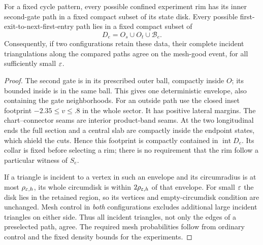 \begin{lemma}
\label{lemma:fixed-collar}
For a fixed cycle pattern, every possible confined experiment rim has
its inner second-gate path in a fixed compact subset of its state disk.
Every possible first-exit-to-next-first-entry path lies in a fixed
compact subset of
\[
 D_e=O_s\cup O_t\cup\mathcal B_e.
\]
Consequently, if two configurations retain these data, their complete
incident triangulations along the compared paths agree on the mesh-good
event, for all sufficiently small $\varepsilon$.
\end{lemma}

\begin{proof}
The second gate is in its prescribed outer ball, compactly inside $O$;
its bounded inside is in the same ball.  This gives one deterministic
envelope, also containing the gate neighborhoods.  For an outside path
use the closed inset footprint $-2.35\le v\le.8$ in the whole sector.
It has positive lateral margins.  The chart--connector seams are
interior product-band seams.  At the two longitudinal ends the full
section and a central slab are compactly inside the endpoint states,
which shield the cuts.  Hence this footprint is compactly contained in
$\operatorname{int}D_e$.  Its collar is fixed before selecting a rim;
there is no requirement that the rim follow a particular witness of
$S_e$.

If a triangle is incident to a vertex in such an envelope and its
circumradius is at most $\rho_{\varepsilon,h}$, its whole circumdisk is within
$2\rho_{\varepsilon,h}$ of that envelope.  For small $\varepsilon$ the disk lies in
the retained region, so its vertices and empty-circumdisk condition are
unchanged.  Mesh control in \emph{both} configurations excludes additional
large incident triangles on either side.  Thus all incident triangles,
not only the edges of a preselected path, agree.  The required mesh
probabilities follow from ordinary control and the fixed density bounds
for the experiments.
\end{proof}

